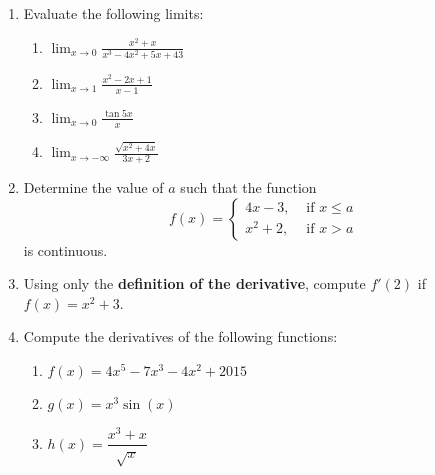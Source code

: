 \documentclass[12pt]{article}
\newcommand{\points}[1]{\marginpar{\hspace{24pt}[#1]}}
\newcommand{\ds}{\displaystyle}
\begin{document}
\begin{enumerate}
 \item Evaluate the following limits:
\begin{enumerate}
\item $\ds \lim_{x\to 0}\frac{x^2+x}{x^3-4x^2+5x+43}$ \points{2}

\vspace{2in} 

\item $\ds \lim_{x\to 1}\frac{x^2-2x+1}{x-1}$ \points{2}

\vspace{2in}

 \item $\ds \lim_{x\to 0}\frac{\tan 5x}{x}$ \points{3}

\vspace{2in}

 \item $\ds \lim_{x\to -\infty}\frac{\sqrt{x^2+4x}}{3x+2}$ \points{3}
\end{enumerate}
\newpage

\item Determine the value of $a$ such that the function \points{4}
\[
 f(x) = \begin{cases}
         4x-3, & \text{ if } x\leq a\\
         x^2+2, & \text{ if } x>a
        \end{cases}
\]
is continuous.

\vspace{4in}

\item Using only the {\bf definition of the derivative}, compute $f'(2)$ if $f(x) = x^2+3$. \points{4}


\newpage

\item Compute the derivatives of the following functions:
\begin{enumerate}
 \item $f(x) = 4x^5-7x^3-4x^2+2015$ \points{2}

\vspace{1in}

 \item $g(x) = x^3\sin (x)$ \points{2}

\vspace{1in}

 \item $h(x) = \dfrac{x^3+x}{\sqrt{x}}$ \points{3}

\vspace{1.5in}


\end{enumerate}
\end{enumerate}
\end{document}
